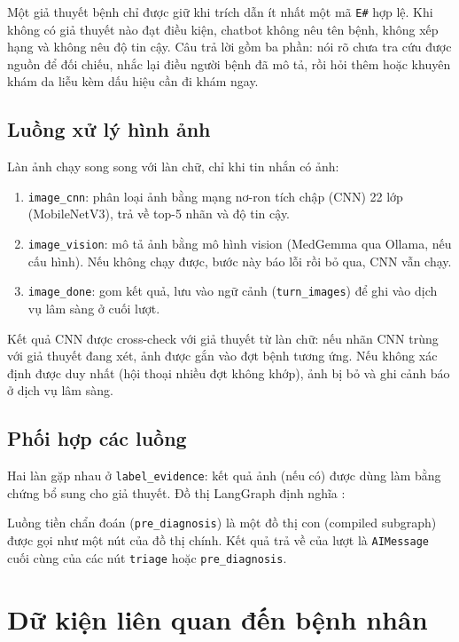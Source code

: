 Một giả thuyết bệnh chỉ được giữ khi trích dẫn ít nhất một mã \texttt{E\#} hợp lệ. Khi không có giả thuyết nào đạt điều kiện, chatbot không nêu tên bệnh, không xếp hạng và không nêu độ tin cậy. Câu trả lời gồm ba phần: nói rõ chưa tra cứu được nguồn để đối chiếu, nhắc lại điều người bệnh đã mô tả, rồi hỏi thêm hoặc khuyên khám da liễu kèm dấu hiệu cần đi khám ngay.

\subsection{Luồng xử lý hình ảnh}

Làn ảnh chạy song song với làn chữ, chỉ khi tin nhắn có ảnh:

\begin{enumerate}
  \item \texttt{image\_cnn}: phân loại ảnh bằng mạng nơ-ron tích chập (CNN) 22 lớp (MobileNetV3), trả về top-5 nhãn và độ tin cậy.
  \item \texttt{image\_vision}: mô tả ảnh bằng mô hình vision (MedGemma qua Ollama, nếu cấu hình). Nếu không chạy được, bước này báo lỗi rồi bỏ qua, CNN vẫn chạy.
  \item \texttt{image\_done}: gom kết quả, lưu vào ngữ cảnh (\texttt{turn\_images}) để ghi vào dịch vụ lâm sàng ở cuối lượt.
\end{enumerate}

Kết quả CNN được cross-check với giả thuyết từ làn chữ: nếu nhãn CNN trùng với giả thuyết đang xét, ảnh được gắn vào đợt bệnh tương ứng. Nếu không xác định được duy nhất (hội thoại nhiều đợt không khớp), ảnh bị bỏ và ghi cảnh báo ở dịch vụ lâm sàng.

\subsection{Phối hợp các luồng}

Hai làn gặp nhau ở \texttt{label\_evidence}: kết quả ảnh (nếu có) được dùng làm bằng chứng bổ sung cho giả thuyết. Đồ thị LangGraph định nghĩa :


Luồng tiền chẩn đoán (\texttt{pre\_diagnosis}) là một đồ thị con (compiled subgraph) được gọi như một nút của đồ thị chính. Kết quả trả về của lượt là \texttt{AIMessage} cuối cùng của các nút \texttt{triage} hoặc \texttt{pre\_diagnosis}.
\section{Dữ kiện liên quan đến bệnh nhân}
\label{sec:du-kien-benh-nhan}

